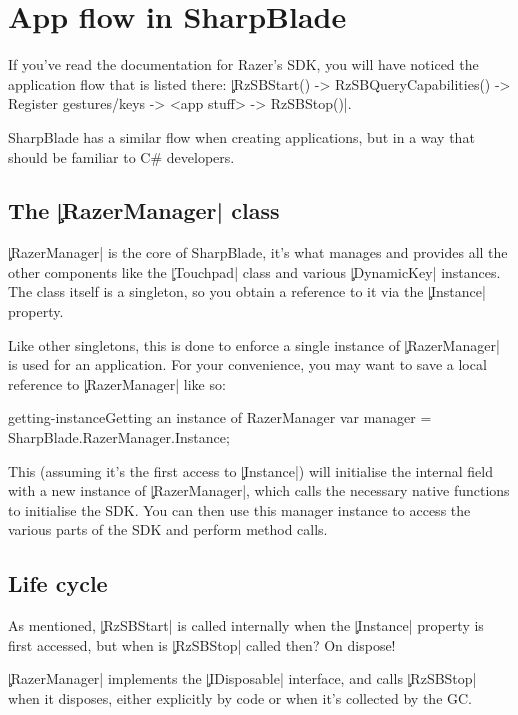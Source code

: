 \chapter{App flow in SharpBlade}
If you've read the documentation for Razer's SDK, you will have noticed the application flow that is listed there: \c|RzSBStart() -> RzSBQueryCapabilities() -> Register gestures/keys -> <app stuff> -> RzSBStop()|.

SharpBlade has a similar flow when creating applications, but in a way that should be familiar to C\# developers.

\section[The RazerManager class]{The \c|RazerManager| class}
\c|RazerManager| is the core of SharpBlade, it's what manages and provides all the other components like the \c|Touchpad| class and various \c|DynamicKey| instances. The class itself is a singleton, so you obtain a reference to it via the \c|Instance| property.

Like other singletons, this is done to enforce a single instance of \c|RazerManager| is used for an application. For your convenience, you may want to save a local reference to \c|RazerManager| like so:

\begin{csexample}{getting-instance}{Getting an instance of RazerManager}
    var manager = SharpBlade.RazerManager.Instance;
\end{csexample}

This (assuming it's the first access to \c|Instance|) will initialise the internal field with a new instance of \c|RazerManager|, which calls the necessary native functions to initialise the SDK. You can then use this manager instance to access the various parts of the SDK and perform method calls.

\section{Life cycle}
As mentioned, \c|RzSBStart| is called internally when the \c|Instance| property is first accessed, but when is \c|RzSBStop| called then? On dispose!

\c|RazerManager| implements the \c|IDisposable| interface, and calls \c|RzSBStop| when it disposes, either explicitly by code or when it's collected by the GC.
